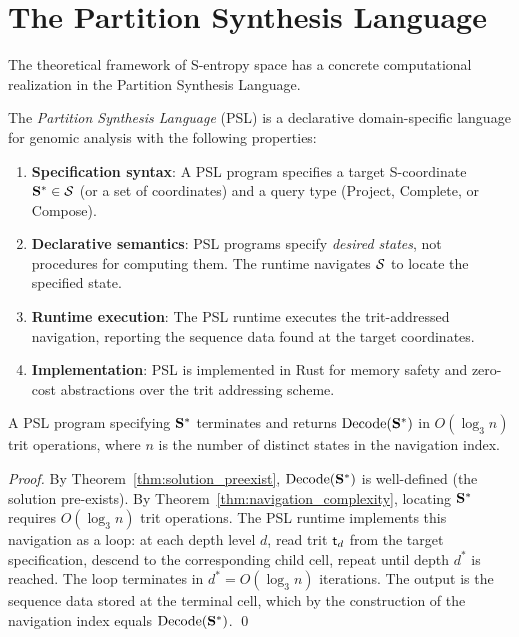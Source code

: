 \section{The Partition Synthesis Language}
\label{sec:psl}

The theoretical framework of S-entropy space has a concrete computational
realization in the Partition Synthesis Language.

\begin{definition}
\label{def:psl}
The \emph{Partition Synthesis Language} (PSL) is a declarative domain-specific
language for genomic analysis with the following properties:
\begin{enumerate}[label=(\roman*)]
  \item \textbf{Specification syntax}: A PSL program specifies a target
        S-coordinate $\mathbf{S}^* \in \mathcal{S}$ (or a set of coordinates) and
        a query type (Project, Complete, or Compose).
  \item \textbf{Declarative semantics}: PSL programs specify \emph{desired states},
        not procedures for computing them. The runtime navigates $\mathcal{S}$
        to locate the specified state.
  \item \textbf{Runtime execution}: The PSL runtime executes the trit-addressed
        navigation, reporting the sequence data found at the target coordinates.
  \item \textbf{Implementation}: PSL is implemented in Rust for memory safety
        and zero-cost abstractions over the trit addressing scheme.
\end{enumerate}
\end{definition}

\begin{proposition}
\label{prop:psl_correct}
A PSL program specifying $\mathbf{S}^*$ terminates and returns $\mathrm{Decode}(\mathbf{S}^*)$
in $O(\log_3 n)$ trit operations, where $n$ is the number of distinct states
in the navigation index.
\end{proposition}

\begin{proof}
By Theorem~\ref{thm:solution_preexist}, $\mathrm{Decode}(\mathbf{S}^*)$ is
well-defined (the solution pre-exists). By Theorem~\ref{thm:navigation_complexity},
locating $\mathbf{S}^*$ requires $O(\log_3 n)$ trit operations. The PSL runtime
implements this navigation as a loop: at each depth level $d$, read trit
$\mathsf{t}_d$ from the target specification, descend to the corresponding child
cell, repeat until depth $d^*$ is reached. The loop terminates in $d^* = O(\log_3 n)$
iterations. The output is the sequence data stored at the terminal cell, which
by the construction of the navigation index equals $\mathrm{Decode}(\mathbf{S}^*)$. \qed
\end{proof}

